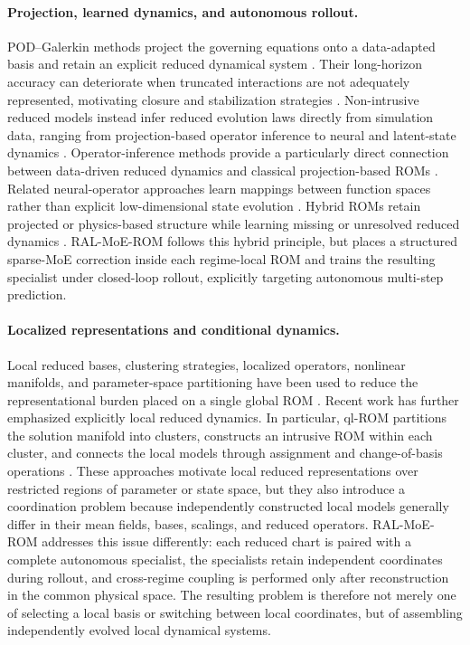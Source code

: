 \documentclass{article}
\begin{document}
\paragraph{Projection, learned dynamics, and autonomous rollout.}
POD--Galerkin methods project the governing equations onto a data-adapted basis and retain an explicit reduced dynamical system \citep{sirovich1987,berkooz1993,benner2015}. Their long-horizon accuracy can deteriorate when truncated interactions are not adequately represented, motivating closure and stabilization strategies
\citep{amsallem2012}. Non-intrusive reduced models instead infer reduced evolution laws directly from simulation data, ranging from projection-based operator inference to neural and latent-state dynamics
\citep{peherstorfer2016,hesthaven2018,champion2019,lee2020, pan2024domain,park2024}. Operator-inference methods provide a particularly direct connection between data-driven reduced dynamics and classical projection-based ROMs \citep{kramer2024}. Related neural-operator approaches learn mappings between function spaces
rather than explicit low-dimensional state evolution \citep{lu2021,kovachki2023}. Hybrid ROMs retain projected or physics-based structure while learning missing or unresolved reduced dynamics \citep{duraisamy2019,brunton2020,fresca2022,dar2023,geelen2023,manti2025}. RAL-MoE-ROM follows this hybrid principle, but places a structured sparse-MoE correction inside each regime-local ROM and trains the resulting specialist under closed-loop rollout, explicitly targeting autonomous multi-step prediction.




\paragraph{Localized representations and conditional dynamics.}
Local reduced bases, clustering strategies, localized operators, nonlinear manifolds, and parameter-space partitioning have been used to reduce the representational burden placed on a single global ROM \citep{amsallem2008,peherstorfer2014,kaiser2014,li2021cluster,diaz2024}. Recent work has further emphasized explicitly local reduced dynamics. In particular, ql-ROM partitions the solution manifold into clusters, constructs an intrusive ROM within each cluster, and connects the local models through assignment and change-of-basis operations
\citep{colanera2025}. These approaches motivate local reduced representations over restricted regions of parameter or state space, but they also introduce a coordination problem because independently constructed local models generally differ in
their mean fields, bases, scalings, and reduced operators. RAL-MoE-ROM addresses this issue differently: each reduced chart is paired with a complete autonomous specialist, the specialists retain independent coordinates during rollout, and cross-regime coupling is performed only after reconstruction in the common physical space. The resulting problem is therefore not merely one of selecting a local basis or switching between local coordinates, but of assembling independently evolved local dynamical systems.
\end{document}
